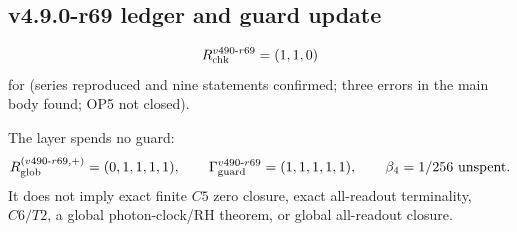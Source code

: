 \subsection*{v4.9.0-r69 ledger and guard update}
\label{subsec:v490-r69-ledger-guard}

\[
R_{\rm chk}^{v490\text{-}r69}=(1,1,0)
\]
for (series reproduced and nine statements confirmed; three errors in the main body found; OP5 not closed).

The layer spends no guard:
\[
R_{\rm glob}^{(v490\text{-}r69,+)}=(0,1,1,1,1),
\qquad
\Gamma_{\rm guard}^{v490\text{-}r69}=(1,1,1,1,1),
\qquad
\beta_4=1/256\ \text{unspent}.
\]
It does not imply exact finite \(C5\) zero closure, exact all-readout terminality,
\(C6/T2\), a global photon-clock/RH theorem, or global all-readout closure.
